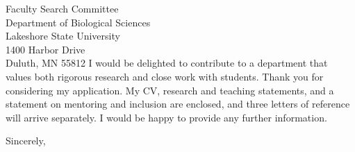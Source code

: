 \documentclass[11pt]{letter}
\begin{document}
\begin{letter}{Faculty Search Committee\\
  Department of Biological Sciences\\
  Lakeshore State University\\
  1400 Harbor Drive\\
  Duluth, MN 55812}
I would be delighted to contribute to a department that values both rigorous research and close work with students. Thank you for considering my application. My CV, research and teaching statements, and a statement on mentoring and inclusion are enclosed, and three letters of reference will arrive separately. I would be happy to provide any further information.

\closing{Sincerely,}


\end{letter}
\end{document}
